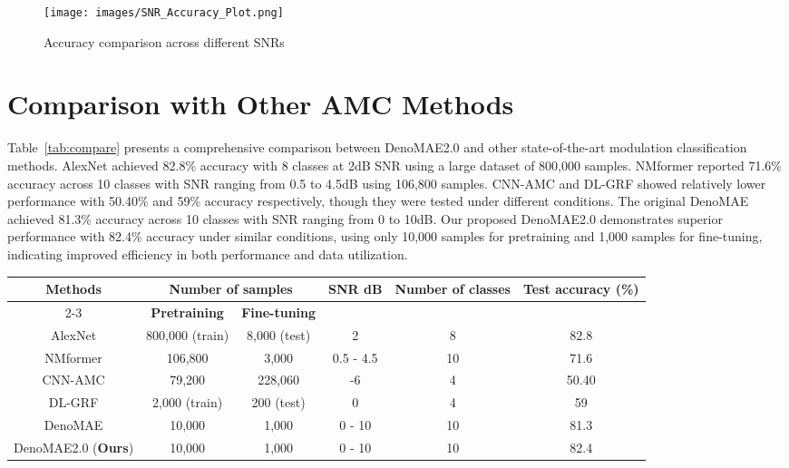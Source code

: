 \begin{figure}[htbp]
    \centering
    \texttt{[image: images/SNR\_Accuracy\_Plot.png]}
    \caption{Accuracy comparison across different SNRs}
    \label{fig:snr_acc}
\end{figure}

\section{Comparison with Other AMC Methods}

Table~\ref{tab:compare} presents a comprehensive comparison between DenoMAE2.0 and other state-of-the-art modulation classification methods. AlexNet achieved 82.8\% accuracy with 8 classes at 2dB SNR using a large dataset of 800,000 samples. NMformer reported 71.6\% accuracy across 10 classes with SNR ranging from 0.5 to 4.5dB using 106,800 samples. CNN-AMC and DL-GRF showed relatively lower performance with 50.40\% and 59\% accuracy respectively, though they were tested under different conditions. The original DenoMAE achieved 81.3\% accuracy across 10 classes with SNR ranging from 0 to 10dB. Our proposed DenoMAE2.0 demonstrates superior performance with 82.4\% accuracy under similar conditions, using only 10,000 samples for pretraining and 1,000 samples for fine-tuning, indicating improved efficiency in both performance and data utilization.

\begin{table*}[htbp]
    \centering
    \caption{Comparison of DenoMAE2.0 with other modulation classification methods}
    \label{tab:compare}
    \begin{tabular}{cccccc}
    \toprule
    \multirow{2}{*}{\textbf{Methods}} & \multicolumn{2}{c}{\textbf{Number of samples}} & \multirow{2}{*}{\textbf{SNR dB}} & \multirow{2}{*}{\textbf{Number of classes}} & \multirow{2}{*}{\textbf{Test accuracy (\%)}} \\ 
    \cmidrule(lr){2-3}
     & \textbf{Pretraining} & \textbf{Fine-tuning} & & \\ \midrule
    
    AlexNet \cite{peng2018modulation}  & 800,000 (train) & 8,000 (test)  & 2 & 8 & 82.8  \\
    NMformer \cite{faysal2024nmformer} & 106,800 & 3,000 & 0.5 - 4.5 & 10 & 71.6 \\
    CNN-AMC \cite{meng2018automatic} & 79,200 & 228,060 & -6 & 4 & 50.40 \\
    DL-GRF \cite{sun2022automatic} &  2,000 (train) & 200 (test) & 0 & 4 & 59 \\
    DenoMAE \cite{faysal2025denomae} & 10,000 & 1,000 & 0 - 10 & 10 & 81.3 \\
    DenoMAE2.0 (\textbf{Ours}) & 10,000 & 1,000 & 0 - 10 & 10 & 82.4 \\
    
    \bottomrule
    \end{tabular}
\end{table*}


